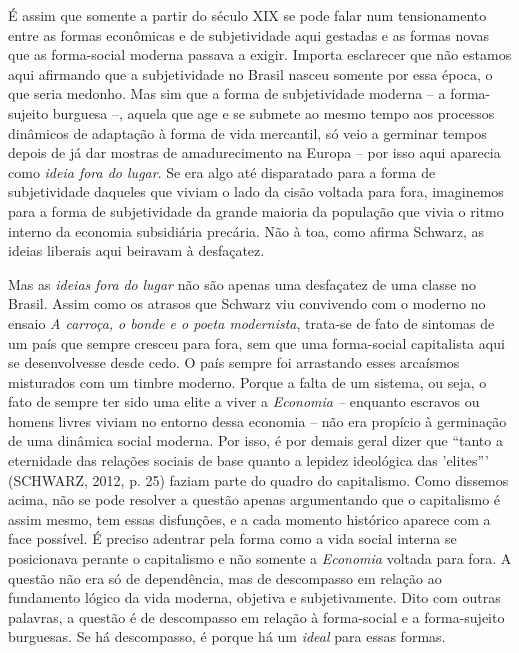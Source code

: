 É assim que somente a partir do século XIX se pode falar num
tensionamento entre as formas econômicas e de subjetividade aqui
gestadas e as formas novas que as forma-social moderna passava a exigir.
Importa esclarecer que não estamos aqui afirmando que a subjetividade no
Brasil nasceu somente por essa época, o que seria medonho. Mas sim que a
forma de subjetividade moderna -- a forma-sujeito burguesa --, aquela
que age e se submete ao mesmo tempo aos processos dinâmicos de adaptação
à forma de vida mercantil, só veio a germinar tempos depois de já dar
mostras de amadurecimento na Europa -- por isso aqui aparecia como
\emph{ideia fora do lugar}. Se era algo até disparatado para a forma de
subjetividade daqueles que viviam o lado da cisão voltada para fora,
imaginemos para a forma de subjetividade da grande maioria da população
que vivia o ritmo interno da economia subsidiária precária. Não à toa,
como afirma Schwarz, as ideias liberais aqui beiravam à desfaçatez.

Mas as \emph{ideias} \emph{fora} \emph{do} \emph{lugar} não são apenas
uma desfaçatez de uma classe no Brasil. Assim como os atrasos que
Schwarz viu convivendo com o moderno no ensaio \emph{A carroça, o bonde
e o poeta modernista}, trata-se de fato de sintomas de um país que
sempre cresceu para fora, sem que uma forma-social capitalista aqui se
desenvolvesse desde cedo. O país sempre foi arrastando esses arcaísmos
misturados com um timbre moderno. Porque a falta de um sistema, ou seja,
o fato de sempre ter sido uma elite a viver a \emph{Economia --}
enquanto escravos ou homens livres viviam no entorno dessa economia --
não era propício à germinação de uma dinâmica social moderna. Por isso,
é por demais geral dizer que ``tanto a eternidade das relações sociais
de base quanto a lepidez ideológica das 'elites''' (SCHWARZ, 2012, p.
25) faziam parte do quadro do capitalismo. Como dissemos acima, não se
pode resolver a questão apenas argumentando que o capitalismo é assim
mesmo, tem essas disfunções, e a cada momento histórico aparece com a
face possível. É preciso adentrar pela forma como a vida social interna
se posicionava perante o capitalismo e não somente a \emph{Economia}
voltada para fora. A questão não era só de dependência, mas de
descompasso em relação ao fundamento lógico da vida moderna, objetiva e
subjetivamente. Dito com outras palavras, a questão é de descompasso em
relação à forma-social e a forma-sujeito burguesas. Se há descompasso, é
porque há um \emph{ideal} para essas formas.

